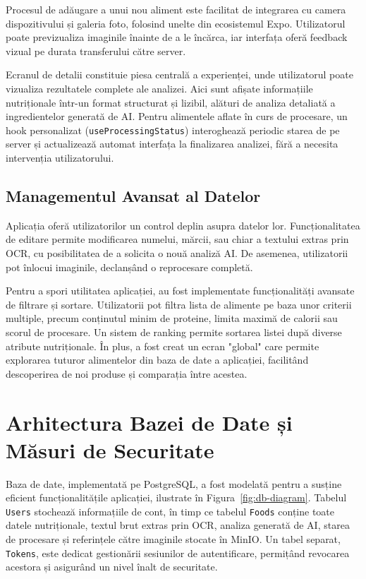 Procesul de adăugare a unui nou aliment este facilitat de integrarea cu camera dispozitivului și galeria foto, folosind unelte din ecosistemul Expo. Utilizatorul poate previzualiza imaginile înainte de a le încărca, iar interfața oferă feedback vizual pe durata transferului către server.

Ecranul de detalii constituie piesa centrală a experienței, unde utilizatorul poate vizualiza rezultatele complete ale analizei. Aici sunt afișate informațiile nutriționale într-un format structurat și lizibil, alături de analiza detaliată a ingredientelor generată de AI. Pentru alimentele aflate în curs de procesare, un hook personalizat (\texttt{useProcessingStatus}) interoghează periodic starea de pe server și actualizează automat interfața la finalizarea analizei, fără a necesita intervenția utilizatorului.

\subsection{Managementul Avansat al Datelor}

Aplicația oferă utilizatorilor un control deplin asupra datelor lor. Funcționalitatea de editare permite modificarea numelui, mărcii, sau chiar a textului extras prin OCR, cu posibilitatea de a solicita o nouă analiză AI. De asemenea, utilizatorii pot înlocui imaginile, declanșând o reprocesare completă.

Pentru a spori utilitatea aplicației, au fost implementate funcționalități avansate de filtrare și sortare. Utilizatorii pot filtra lista de alimente pe baza unor criterii multiple, precum conținutul minim de proteine, limita maximă de calorii sau scorul de procesare. Un sistem de ranking permite sortarea listei după diverse atribute nutriționale. În plus, a fost creat un ecran "global" care permite explorarea tuturor alimentelor din baza de date a aplicației, facilitând descoperirea de noi produse și comparația între acestea.

\section{Arhitectura Bazei de Date și Măsuri de Securitate}

Baza de date, implementată pe PostgreSQL, a fost modelată pentru a susține eficient funcționalitățile aplicației, ilustrate în Figura~\ref{fig:db-diagram}. Tabelul \texttt{Users} stochează informațiile de cont, în timp ce tabelul \texttt{Foods} conține toate datele nutriționale, textul brut extras prin OCR, analiza generată de AI, starea de procesare și referințele către imaginile stocate în MinIO. Un tabel separat, \texttt{Tokens}, este dedicat gestionării sesiunilor de autentificare, permițând revocarea acestora și asigurând un nivel înalt de securitate.

